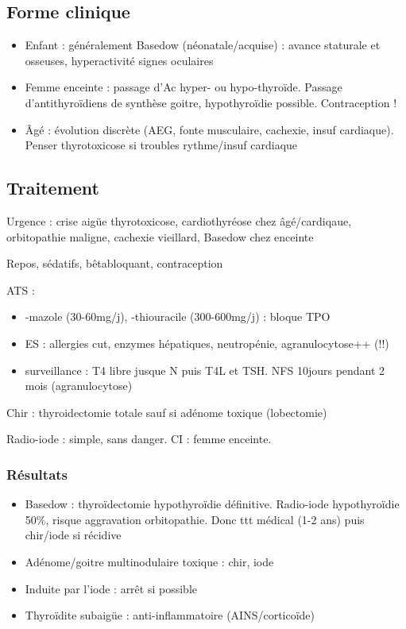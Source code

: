 \documentclass[11pt]{article}
\begin{document}
\subsection{Forme clinique}
\label{sec:org97d580c}
\begin{itemize}
\item Enfant : généralement Basedow (néonatale/acquise) : avance staturale et
osseuses, hyperactivité \textpm{} signes oculaires
\item Femme enceinte : passage d'Ac \thus hyper- ou hypo-thyroïde. Passage
d'antithyroïdiens de synthèse \thus goitre, hypothyroïdie possible. Contraception !
\item Âgé : évolution discrète (AEG, fonte musculaire, cachexie, insuf
cardiaque). Penser thyrotoxicose si troubles rythme/insuf cardiaque
\end{itemize}

\subsection{Traitement}
\label{sec:org14d46fd}
\skull{} Urgence : crise aigüe thyrotoxicose, cardiothyréose chez âgé/cardiqaue,
orbitopathie maligne, cachexie vieillard, Basedow chez \female{} enceinte

Repos, sédatifs, bêtabloquant, contraception

\gls{ATS} :
\begin{itemize}
\item -mazole (30-60mg/j), -thiouracile (300-600mg/j) : bloque TPO
\item ES : allergies cut, \inc enzymes hépatiques, neutropénie, agranulocytose++
(\skull !!)
\item surveillance : T4 libre jusque N puis T4L et TSH. NFS 10jours pendant 2 mois (agranulocytose)
\end{itemize}

Chir : thyroidectomie totale sauf si adénome toxique (lobectomie)

Radio-iode : simple, sans danger. CI : femme enceinte.

\subsubsection{Résultats}
\label{sec:orgec786c6}
\begin{itemize}
\item Basedow : thyroïdectomie \thus hypothyroïdie définitive. Radio-iode \thus
hypothyroïdie 50\%, risque aggravation orbitopathie. Donc ttt médical (1-2
ans) puis chir/iode si récidive
\item Adénome/goitre multinodulaire toxique : chir, iode
\item Induite par l'iode : arrêt si possible
\item Thyroïdite subaigüe : anti-inflammatoire (AINS/corticoïde)
\end{itemize}
\end{document}
